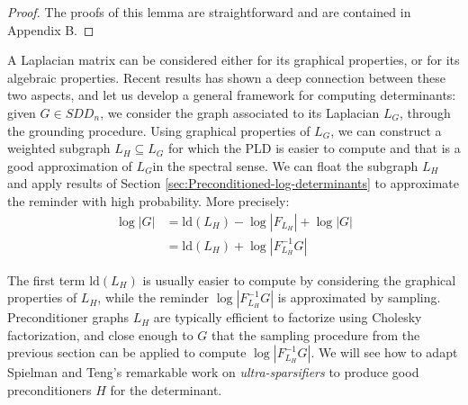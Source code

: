 \begin{proof}The proofs of this lemma are straightforward and are
contained in Appendix B. \end{proof} 

A Laplacian matrix can be considered either for its graphical properties,
or for its algebraic properties. Recent results has shown a deep connection
between these two aspects, and let us develop a general framework
for computing determinants: given $G\in SDD_{n}$, we consider the
graph associated to its Laplacian $L_{G}$, through the grounding
procedure. Using graphical properties of $L_{G}$, we can construct
a weighted subgraph $L_{H}\subseteq L_{G}$ for which the PLD is easier
to compute and that is a good approximation of $L_{G}$in the spectral
sense. We can float the subgraph $L_{H}$ and apply results of Section
\ref{sec:Preconditioned-log-determinants} to approximate the reminder
with high probability. More precisely:
\begin{align*}
\log\left|G\right| & =\text{ld}\left(L_{H}\right)-\log\left|F_{L_{H}}\right|+\log\left|G\right|\\
 & =\text{ld}\left(L_{H}\right)+\log\left|F_{L_{H}}^{-1}G\right|
\end{align*}


The first term $\text{ld}\left(L_{H}\right)$ is usually easier to
compute by considering the graphical properties of $L_{H}$, while
the reminder $\log\left|F_{L_{H}}^{-1}G\right|$ is approximated by
sampling. Preconditioner graphs $L_{H}$ are typically efficient to
factorize using Cholesky factorization, and close enough to $G$ that
the sampling procedure from the previous section can be applied to
compute $\log\left|F_{L_{H}}^{-1}G\right|$. We will see how to adapt
Spielman and Teng's remarkable work on \emph{ultra-sparsifiers} to
produce good preconditioners $H$ for the determinant. 
